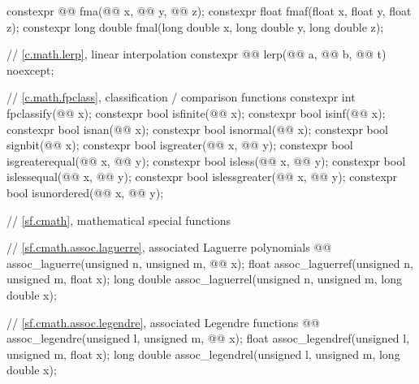 \begin{codeblock}
{  constexpr @@ fma(@@ x, @@ y,
                                    @@ z);
  constexpr float               fmaf(float x, float y, float z);
  constexpr long double         fmal(long double x, long double y, long double z);

  // \ref{c.math.lerp}, linear interpolation
  constexpr @@ lerp(@@ a, @@ b,
                                     @@ t) noexcept;

  // \ref{c.math.fpclass}, classification / comparison functions
  constexpr int fpclassify(@@ x);
  constexpr bool isfinite(@@ x);
  constexpr bool isinf(@@ x);
  constexpr bool isnan(@@ x);
  constexpr bool isnormal(@@ x);
  constexpr bool signbit(@@ x);
  constexpr bool isgreater(@@ x, @@ y);
  constexpr bool isgreaterequal(@@ x, @@ y);
  constexpr bool isless(@@ x, @@ y);
  constexpr bool islessequal(@@ x, @@ y);
  constexpr bool islessgreater(@@ x, @@ y);
  constexpr bool isunordered(@@ x, @@ y);

  // \ref{sf.cmath}, mathematical special functions

  // \ref{sf.cmath.assoc.laguerre}, associated Laguerre polynomials
  @@ assoc_laguerre(unsigned n, unsigned m, @@ x);
  float               assoc_laguerref(unsigned n, unsigned m, float x);
  long double         assoc_laguerrel(unsigned n, unsigned m, long double x);

  // \ref{sf.cmath.assoc.legendre}, associated Legendre functions
  @@ assoc_legendre(unsigned l, unsigned m, @@ x);
  float               assoc_legendref(unsigned l, unsigned m, float x);
  long double         assoc_legendrel(unsigned l, unsigned m, long double x);

}
\end{codeblock}
